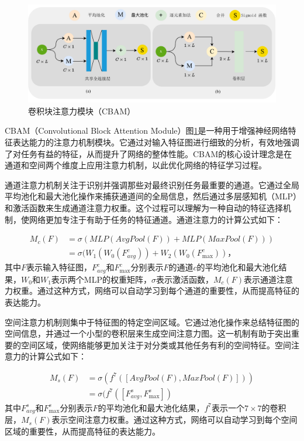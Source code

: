 \begin{figure}
    \centering
    \includegraphics[width=\textwidth]{Image/CBAM_cn.pdf}
    \caption{卷积块注意力模块（CBAM）}
    \label{fig:cbam}
\end{figure}

CBAM（Convolutional Block Attention Module）图\ref{fig:cbam}是一种用于增强神经网络特征表达能力的注意力机制模块。它通过对输入特征图进行细致的分析，有效地强调了对任务有益的特征，从而提升了网络的整体性能。CBAM的核心设计理念是在通道和空间两个维度上应用注意力机制，以此优化网络的特征学习过程\cite{woo2018cbam}。

通道注意力机制关注于识别并强调那些对最终识别任务最重要的通道。它通过全局平均池化和最大池化操作来捕获通道间的全局信息，然后通过多层感知机（MLP）和激活函数来生成通道注意力权重。这个过程可以理解为一种自动的特征选择机制，使网络更加专注于有助于任务的特征通道。通道注意力的计算公式如下：

\begin{equation}
    \begin{aligned}
    M_c(F) &= \sigma(MLP(AvgPool(F)) + MLP(MaxPool(F))) \\ 
    &= \sigma(W_1(W_0(F_{avg}^c)) + W_2(W_0(F_{\max}^c))，
    \end{aligned}
    \label{equ:CAM}
\end{equation}
其中$F$表示输入特征图，$F_{avg}^c$和$F_{\max}^c$分别表示$F$的通道$c$的平均池化和最大池化结果，$W_0$和$W_1$表示两个MLP的权重矩阵，$\sigma$表示激活函数，$M_c(F)$表示通道注意力权重。通过这种方式，网络可以自动学习到每个通道的重要性，从而提高特征的表达能力。

空间注意力机制则集中于特征图的特定空间区域。它通过池化操作来总结特征图的空间信息，并通过一个小型的卷积层来生成空间注意力图。这一机制有助于突出重要的空间区域，使网络能够更加关注于对分类或其他任务有利的空间特征。空间注意力的计算公式如下：

\begin{equation}
    \begin{aligned}
    M_s(F) &= \sigma(f^{7}([AvgPool(F), MaxPool(F)])) \\
    &= \sigma(f^{7}([F_{avg}^s, F_{\max}^s])
    \end{aligned}
    \label{equ:SAM}
\end{equation}
其中$F_{avg}^s$和$F_{\max}^s$分别表示$F$的平均池化和最大池化结果，$f^7$表示一个$7 \times 7$的卷积层，$M_s(F)$表示空间注意力权重。通过这种方式，网络可以自动学习到每个空间区域的重要性，从而提高特征的表达能力。

